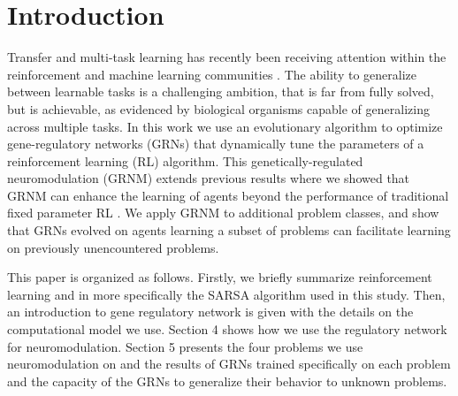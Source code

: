 \section{Introduction}

Transfer and multi-task learning has recently been receiving attention within the reinforcement and machine learning communities \cite{Li2009,Taylor2009}. The ability to generalize between learnable tasks is a challenging ambition, that is far from fully solved, but is achievable, as evidenced by biological organisms capable of generalizing across multiple tasks. In this work we use an evolutionary algorithm to optimize gene-regulatory networks (GRNs) that dynamically tune the parameters of a reinforcement learning (RL) algorithm. This genetically-regulated neuromodulation (GRNM) extends previous results where we showed that GRNM can enhance the learning of agents beyond the performance of traditional fixed parameter RL \cite{Harrington2013}. We apply GRNM to additional problem classes, and show that GRNs evolved on agents learning a subset of problems can facilitate learning on previously unencountered problems. 

This paper is organized as follows. Firstly, we briefly summarize reinforcement learning and in more specifically the SARSA algorithm used in this study. Then, an introduction to gene regulatory network is given with the details on the computational model we use. Section 4 shows how we use the regulatory network for neuromodulation. Section 5 presents the four problems we use neuromodulation on and the results of GRNs trained specifically on each problem and the capacity of the GRNs to generalize their behavior to unknown problems.
